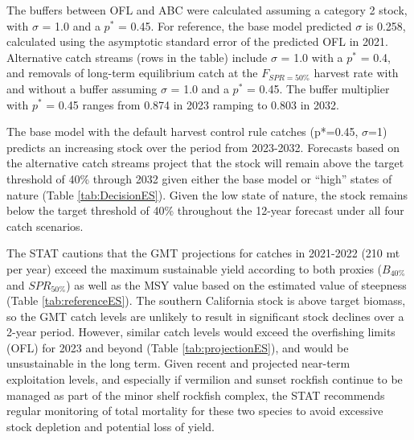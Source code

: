 \documentclass[11pt,
  english,
]{article}
\begin{document}
The buffers between OFL and ABC were calculated assuming a category 2 stock, with {\(\sigma\)\leavevmode\tagmcend\tagstructend} = 1.0 and a {\(p^*\)\leavevmode\tagmcend\tagstructend} = 0.45. For reference, the base model predicted {\(\sigma\)\leavevmode\tagmcend\tagstructend} is 0.258, calculated using the asymptotic standard error of the predicted OFL in 2021. Alternative catch streams (rows in the table) include {\(\sigma\)\leavevmode\tagmcend\tagstructend} = 1.0 with a {\(p^*\)\leavevmode\tagmcend\tagstructend} = 0.4, and removals of long-term equilibrium catch at the {\(F_{SPR=50\%}\)\leavevmode\tagmcend\tagstructend} harvest rate with and without a buffer assuming {\(\sigma\)\leavevmode\tagmcend\tagstructend} = 1.0 and a {\(p^*\)\leavevmode\tagmcend\tagstructend} = 0.45. The buffer multiplier with {\(p^*\)\leavevmode\tagmcend\tagstructend} = 0.45 ranges from 0.874 in 2023 ramping to 0.803 in 2032.

The base model with the default harvest control rule catches (p*=0.45, {\(\sigma\)\leavevmode\tagmcend\tagstructend}=1) predicts an increasing stock over the period from 2023-2032. Forecasts based on the alternative catch streams project that the stock will remain above the target threshold of 40\% through 2032 given either the base model or ``high'' states of nature (Table \ref{tab:DecisionES}). Given the low state of nature, the stock remains below the target threshold of 40\% throughout the 12-year forecast under all four catch scenarios.

The STAT cautions that the GMT projections for catches in 2021-2022 (210 mt per year) exceed the maximum sustainable yield according to both proxies ({\(B_{40\%}\)\leavevmode\tagmcend\tagstructend} and {\(SPR_{50\%}\)\leavevmode\tagmcend\tagstructend}) as well as the MSY value based on the estimated value of steepness (Table \ref{tab:referenceES}). The southern California stock is above target biomass, so the GMT catch levels are unlikely to result in significant stock declines over a 2-year period. However, similar catch levels would exceed the overfishing limits (OFL) for 2023 and beyond (Table \ref{tab:projectionES}), and would be unsustainable in the long term. Given recent and projected near-term exploitation levels, and especially if vermilion and sunset rockfish continue to be managed as part of the minor shelf rockfish complex, the STAT recommends regular monitoring of total mortality for these two species to avoid excessive stock depletion and potential loss of yield.
\end{document}
